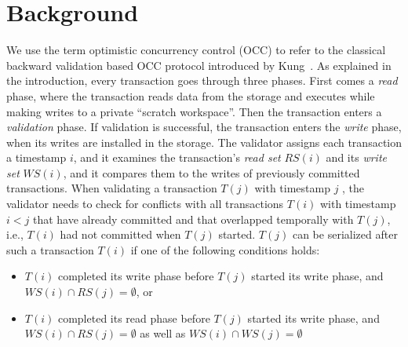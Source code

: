 \section{Background}\label{sec:background}

We use the term optimistic concurrency control (OCC) to refer to the classical backward validation based OCC protocol introduced by Kung~\cite{kung81tods}.
As explained in the introduction, every transaction goes through three phases. First comes a \emph{read} phase, where the transaction reads data from the storage and executes while making writes to a private ``scratch workspace''. Then the transaction enters a \emph{validation} phase. If validation is successful, the transaction enters the \emph{write} phase, when its writes are installed in the storage. 
The validator assigns each transaction a timestamp $i$, and it examines the transaction's \emph{read set} $RS(i)$ and its \emph{write set} $WS(i)$, and it compares them to the writes of previously committed transactions. 
When validating a transaction $T(j)$ with timestamp $j$ , the validator needs to check for conflicts with all transactions $T(i)$ with timestamp $i<j$ that have already committed and that overlapped temporally with $T(j)$, i.e., $T(i)$ had not committed when $T(j)$ started. 
$T(j)$ can be serialized after such a transaction $T(i)$ if one of the following conditions holds:
\begin{itemize}
\vspace{-.5em}
\item $T(i)$ completed its write phase before $T(j)$ started its write phase, and $WS(i) \cap RS(j) = \emptyset$, or
\vspace{-.5em}
\item $T(i)$ completed its read phase before $T(j)$ started its write phase, and $WS(i) \cap RS(j) = \emptyset$ as well as $WS(i) \cap WS(j) = \emptyset$
\vspace{-.5em}
\end{itemize}
